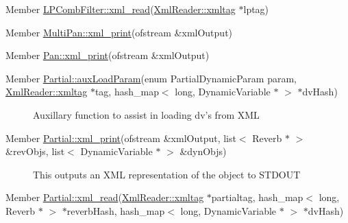 \label{_deprecated000021}
\hypertarget{deprecated__deprecated000021}{}
 \begin{description}
\item[Member \hyperlink{classLPCombFilter_a9}{LPComb\-Filter::xml\_\-read}(\hyperlink{classXmlReader_1_1xmltag}{Xml\-Reader::xmltag} $\ast$lptag) ]\end{description}


\label{_deprecated000022}
\hypertarget{deprecated__deprecated000022}{}
 \begin{description}
\item[Member \hyperlink{classMultiPan_a7}{Multi\-Pan::xml\_\-print}(ofstream \&xml\-Output) ]\end{description}


\label{_deprecated000023}
\hypertarget{deprecated__deprecated000023}{}
 \begin{description}
\item[Member \hyperlink{classPan_a4}{Pan::xml\_\-print}(ofstream \&xml\-Output) ]\end{description}


\label{_deprecated000026}
\hypertarget{deprecated__deprecated000026}{}
 \begin{description}
\item[Member \hyperlink{classPartial_d0}{Partial::aux\-Load\-Param}(enum Partial\-Dynamic\-Param param, \hyperlink{classXmlReader_1_1xmltag}{Xml\-Reader::xmltag} $\ast$tag, hash\_\-map$<$ long, Dynamic\-Variable $\ast$ $>$ $\ast$dv\-Hash) ]Auxillary function to assist in loading dv's from XML \end{description}


\label{_deprecated000024}
\hypertarget{deprecated__deprecated000024}{}
 \begin{description}
\item[Member \hyperlink{classPartial_a3}{Partial::xml\_\-print}(ofstream \&xml\-Output, list$<$ Reverb $\ast$ $>$ \&rev\-Objs, list$<$ Dynamic\-Variable $\ast$ $>$ \&dyn\-Objs) ]This outputs an XML representation of the object to STDOUT \end{description}


\label{_deprecated000025}
\hypertarget{deprecated__deprecated000025}{}
 \begin{description}
\item[Member \hyperlink{classPartial_a4}{Partial::xml\_\-read}(\hyperlink{classXmlReader_1_1xmltag}{Xml\-Reader::xmltag} $\ast$partialtag, hash\_\-map$<$ long, Reverb $\ast$ $>$ $\ast$reverb\-Hash, hash\_\-map$<$ long, Dynamic\-Variable $\ast$ $>$ $\ast$dv\-Hash) ]\end{description}


